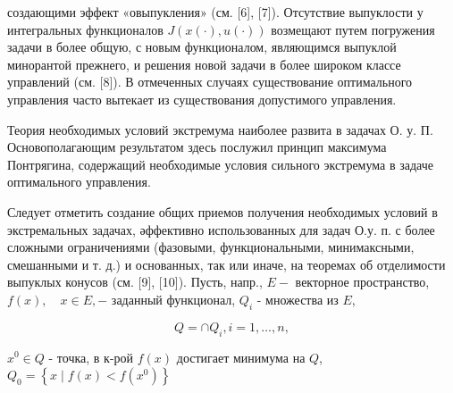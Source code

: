 \documentclass[10pt]{article}
\begin{document}
создающими эффект «овыпукления» (см. [6], [7]). Отсутствие выпуклости у интегральных функционалов $J(x(\cdot), u(\cdot))$ возмещают путем погружения задачи в более общую, с новым функционалом, являющимся выпуклой минорантой прежнего, и решения новой задачи в более широком классе управлений (см. [8]). В отмеченных случаях существование оптимального управления часто вытекает из существования допустимого управления.



Теория необходимых условий экстремума наиболее развита в задачах О. у. П. Основополагающим результатом здесь послужил принцип максимума Понтрягина, содержащий необходимые условия сильного экстремума в задаче оптимального управления.



Следует отметить создание общих приемов получения необходимых условий в экстремальных задачах, әффективно использованных для задач О.у. п. с более сложными ограничениями (фазовыми, функциональными, минимаксными, смешанными и т. д.) и основанных, так или иначе, на теоремах об отделимости выпуклых конусов (см. [9], [10]). Пусть, напр., $E-$ векторное пространство, $f(x), \quad x \in E,-$ заданный функционал, $Q_{i}$ - множества из $E$,



\[

Q=\cap Q_{i}, i=1, \ldots, n,

\]



$x^{0} \in Q$ - точка, в к-рой $f(x)$ достигает минимума на $Q$, $Q_{0}=\left\{x \mid f(x)<f\left(x^{0}\right)\right\}$
\end{document}
